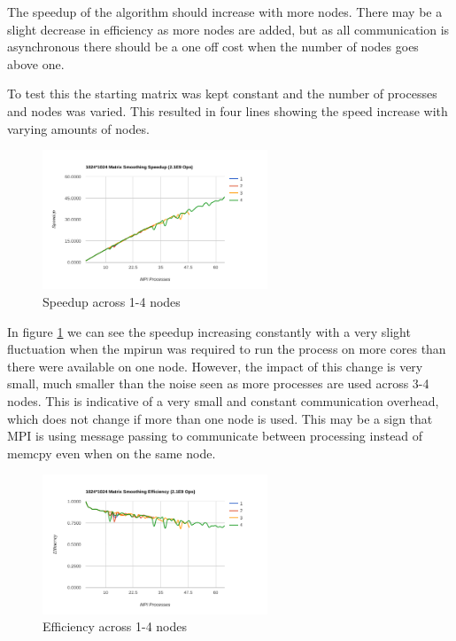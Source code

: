 \documentclass[a4paper,10pt]{report}
\begin{document}
The speedup of the algorithm should increase with more nodes. There may be a slight decrease in efficiency as more nodes are added, but as all communication is asynchronous there should be a one off cost when the number of nodes goes above one.

To test this the starting matrix was kept constant and the number of processes and nodes was varied. This resulted in four lines showing the speed increase with varying amounts of nodes.

\begin{figure}
 \centering
 \includegraphics[width=0.6\textwidth]{./images/nodes-speedup.png}
 \caption{Speedup across 1-4 nodes}
 \label{fig:nodespeedup}
\end{figure}

In figure \ref{fig:nodespeedup} we can see the speedup increasing constantly with a very slight fluctuation when the mpirun was required to run the process on more cores than there were available on one node. However, the impact of this change is very small, much smaller than the noise seen as more processes are used across 3-4 nodes. This is indicative of a very small and constant communication overhead, which does not change if more than one node is used. This may be a sign that MPI is using message passing to communicate between processing instead of memcpy even when on the same node.

\begin{figure}
 \centering
 \includegraphics[width=0.6\textwidth]{./images/nodes-efficiency.png}
 \caption{Efficiency across 1-4 nodes}
 \label{fig:nodeefficiency}
\end{figure}
\end{document}
